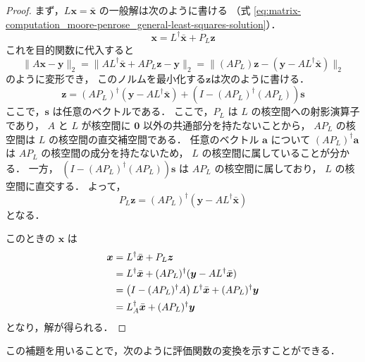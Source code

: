 \begin{proof}
    まず，$L\bm{x}=\bar{\bm{x}}$ の一般解は次のように書ける
    （式 \eqref{eq:matrix-computation_moore-penrose_general-least-squares-solution}）．
    \begin{equation}
        \bm{x} = L^\dagger \bar{\bm{x}} + P_L \bm{z}
    \end{equation}
    これを目的関数に代入すると
    \begin{equation}
        \|A\bm{x} - \bm{y}\|_2
        =\|A L^\dagger \bar{\bm{x}} + A P_L \bm{z} - \bm{y}\|_2
        =\|(A P_L) \bm{z} - (\bm{y} - A L^\dagger \bar{\bm{x}})\|_2
    \end{equation}
    のように変形でき，
    このノルムを最小化する$\bm{z}$は次のように書ける．
    \begin{equation}
        \bm{z} =
        (A P_L)^\dagger (\bm{y} - A L^\dagger \bar{\bm{x}})
        + (I - (A P_L)^\dagger (A P_L)) \bm{s}
    \end{equation}
    ここで，$\bm{s}$ は任意のベクトルである．
    ここで，$P_L$ は $L$ の核空間への射影演算子であり，
    $A$ と $L$ が核空間に $\bm{0}$ 以外の共通部分を持たないことから，
    $A P_L$ の核空間は $L$ の核空間の直交補空間である．
    任意のベクトル $\bm{a}$ について
    $(A P_L)^\dagger \bm{a}$ は $A P_L$ の核空間の成分を持たないため，
    $L$ の核空間に属していることが分かる．
    一方，
    $(I - (A P_L)^\dagger(A P_L)) \bm{s}$
    は $A P_L$ の核空間に属しており，
    $L$ の核空間に直交する．
    よって，
    \begin{equation}
        P_L \bm{z} =
        (A P_L)^\dagger (\bm{y} - A L^\dagger \bar{\bm{x}})
    \end{equation}
    となる．

    このときの $\bm{x}$ は
    \begin{align}
        \bm{x} & = L^\dagger \bar{\bm{x}} + P_L \bm{z} \notag                                               \\
               & = L^\dagger \bar{\bm{x}} +(A P_L)^\dagger (\bm{y} - A L^\dagger \bar{\bm{x}}) \notag       \\
               & = \left(I - (A P_L)^\dagger A \right)L^\dagger \bar{\bm{x}} + (AP_L)^\dagger \bm{y} \notag \\
               & = L_A^\dagger \bar{\bm{x}} + (A P_L)^\dagger \bm{y}
    \end{align}
    となり，解が得られる．
\end{proof}

この補題を用いることで，次のように評価関数の変換を示すことができる．

